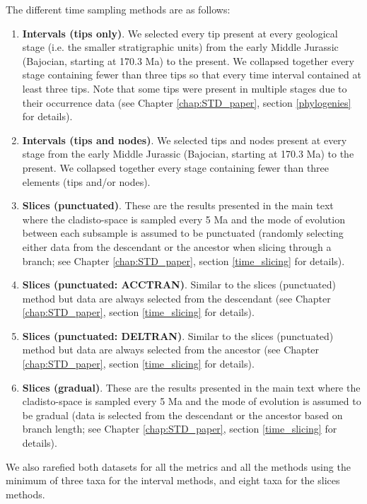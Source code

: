 The different time sampling methods are as follows:
\begin{enumerate}
\item \textbf{Intervals (tips only)}.
We selected every tip present at every geological stage (i.e. the smaller stratigraphic units) from the early Middle Jurassic (Bajocian, starting at 170.3 Ma) to the present.
We collapsed together every stage containing fewer than three tips so that every time interval contained at least three tips.
Note that some tips were present in multiple stages due to their occurrence data (see Chapter \ref{chap:STD_paper}, section \ref{phylogenies} for details).
\item \textbf{Intervals (tips and nodes)}.
We selected tips and nodes present at every stage from the early Middle Jurassic (Bajocian, starting at 170.3 Ma) to the present.
We collapsed together every stage containing fewer than three elements (tips and/or nodes).
\item \textbf{Slices (punctuated)}.
These are the results presented in the main text where the cladisto-space is sampled every 5 Ma and the mode of evolution between each subsample is assumed to be punctuated (randomly selecting either data from the descendant or the ancestor when slicing through a branch; see Chapter \ref{chap:STD_paper}, section \ref{time_slicing} for details).
\item \textbf{Slices (punctuated: ACCTRAN)}.
Similar to the slices (punctuated) method but data are always selected from the descendant (see Chapter \ref{chap:STD_paper}, section \ref{time_slicing} for details).
\item \textbf{Slices (punctuated: DELTRAN)}.
Similar to the slices (punctuated) method but data are always selected from the ancestor (see Chapter \ref{chap:STD_paper}, section \ref{time_slicing} for details).
\item \textbf{Slices (gradual)}.
These are the results presented in the main text where the cladisto-space is sampled every 5 Ma and the mode of evolution is assumed to be gradual (data is selected from the descendant or the ancestor based on branch length; see Chapter \ref{chap:STD_paper}, section \ref{time_slicing} for details).
\end{enumerate}
We also rarefied both datasets for all the metrics and all the methods using the minimum of three taxa for the interval methods, and eight taxa for the slices methods.

